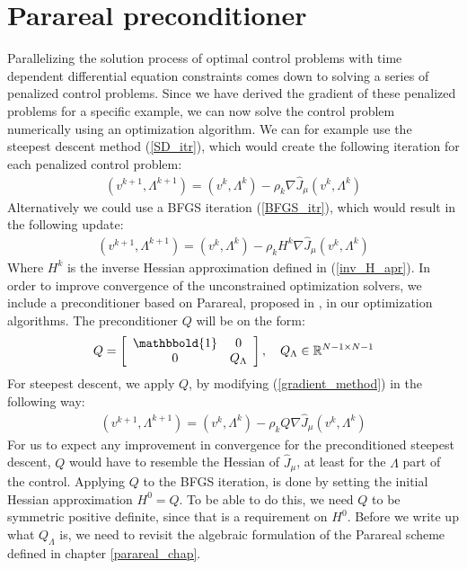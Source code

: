 \section{Parareal preconditioner} \label{pc sec}
Parallelizing the solution process of optimal control problems with time dependent differential equation constraints comes down to solving a series of penalized control problems. Since we have derived the gradient of these penalized problems for a specific example, we can now solve the control problem numerically using an optimization algorithm. We can for example use the steepest descent method (\ref{SD_itr}), which would create the following iteration for each penalized control problem:
\begin{align}
(v^{k+1},\Lambda^{k+1}) = (v^{k},\Lambda^{k}) -\rho_k\nabla\hat{J}_{\mu}(v^{k},\Lambda^{k}) \label{gradient_method}
\end{align}
Alternatively we could use a BFGS iteration (\ref{BFGS_itr}), which would result in the following update:
\begin{align}
(v^{k+1},\Lambda^{k+1}) = (v^{k},\Lambda^{k}) -\rho_kH^{k}\nabla\hat{J}_{\mu}(v^{k},\Lambda^{k}) \label{bfgs_method}
\end{align}
Where $H^k$ is the inverse Hessian approximation defined in (\ref{inv_H_apr}). In order to improve convergence of the unconstrained optimization solvers, we include a preconditioner based on Parareal, proposed in \cite{maday2002parareal}, in our optimization algorithms. The preconditioner $Q$ will be on the form:
\begin{align}
Q = \left[ \begin{array}{cc}
	\mathbbold{1} & 0 \\
	0 & Q_{\Lambda} \\
	\end{array} \right],\quad Q_{\Lambda}\in\mathbb{R}^{N-1\times N-1} \label{PC_form}
\end{align} 
For steepest descent, we apply $Q$, by modifying (\ref{gradient_method}) in the following way:
\begin{align}
(v^{k+1},\Lambda^{k+1}) = (v^{k},\Lambda^{k}) -\rho_kQ\nabla\hat{J}_{\mu}(v^{k},\Lambda^{k}) \label{gradient_method2}
\end{align}
For us to expect any improvement in convergence for the preconditioned steepest descent, $Q$ would have to resemble the Hessian of $\hat{J}_{\mu}$, at least for the $\Lambda$ part of the control. Applying $Q$ to the BFGS iteration, is done by setting the initial Hessian approximation $H^0=Q$. To be able to do this, we need $Q$ to be symmetric positive definite, since that is a requirement on $H^0$. Before we write up what $Q_ {\Lambda}$ is, we need to revisit the algebraic formulation of the Parareal scheme defined in chapter \ref{parareal_chap}.

